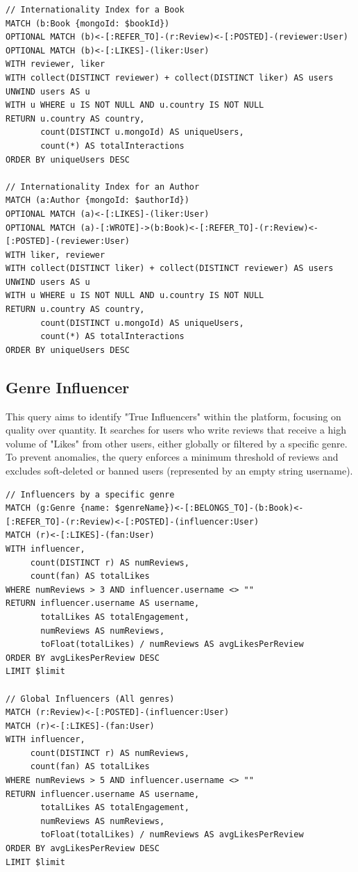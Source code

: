 \begin{lstlisting}[language=Cypher, caption={Cypher Query for Book and Author Internationality Index}]
// Internationality Index for a Book
MATCH (b:Book {mongoId: $bookId})
OPTIONAL MATCH (b)<-[:REFER_TO]-(r:Review)<-[:POSTED]-(reviewer:User)
OPTIONAL MATCH (b)<-[:LIKES]-(liker:User)
WITH reviewer, liker
WITH collect(DISTINCT reviewer) + collect(DISTINCT liker) AS users
UNWIND users AS u
WITH u WHERE u IS NOT NULL AND u.country IS NOT NULL
RETURN u.country AS country, 
       count(DISTINCT u.mongoId) AS uniqueUsers, 
       count(*) AS totalInteractions
ORDER BY uniqueUsers DESC

// Internationality Index for an Author
MATCH (a:Author {mongoId: $authorId})
OPTIONAL MATCH (a)<-[:LIKES]-(liker:User)
OPTIONAL MATCH (a)-[:WROTE]->(b:Book)<-[:REFER_TO]-(r:Review)<-[:POSTED]-(reviewer:User)
WITH liker, reviewer
WITH collect(DISTINCT liker) + collect(DISTINCT reviewer) AS users
UNWIND users AS u
WITH u WHERE u IS NOT NULL AND u.country IS NOT NULL
RETURN u.country AS country, 
       count(DISTINCT u.mongoId) AS uniqueUsers, 
       count(*) AS totalInteractions
ORDER BY uniqueUsers DESC
\end{lstlisting}

\subsection{Genre Influencer}
This query aims to identify "True Influencers" within the platform, focusing on quality over quantity. It searches for users who write reviews that receive a high volume of "Likes" from other users, either globally or filtered by a specific genre. To prevent anomalies, the query enforces a minimum threshold of reviews and excludes soft-deleted or banned users (represented by an empty string username).

\begin{lstlisting}[language=Cypher, caption={Cypher Query for Genre Influencers}]
// Influencers by a specific genre
MATCH (g:Genre {name: $genreName})<-[:BELONGS_TO]-(b:Book)<-[:REFER_TO]-(r:Review)<-[:POSTED]-(influencer:User)
MATCH (r)<-[:LIKES]-(fan:User)
WITH influencer,
     count(DISTINCT r) AS numReviews,
     count(fan) AS totalLikes
WHERE numReviews > 3 AND influencer.username <> ""
RETURN influencer.username AS username,
       totalLikes AS totalEngagement,
       numReviews AS numReviews,
       toFloat(totalLikes) / numReviews AS avgLikesPerReview
ORDER BY avgLikesPerReview DESC
LIMIT $limit

// Global Influencers (All genres)
MATCH (r:Review)<-[:POSTED]-(influencer:User)
MATCH (r)<-[:LIKES]-(fan:User)
WITH influencer,
     count(DISTINCT r) AS numReviews,
     count(fan) AS totalLikes
WHERE numReviews > 5 AND influencer.username <> ""
RETURN influencer.username AS username,
       totalLikes AS totalEngagement,
       numReviews AS numReviews,
       toFloat(totalLikes) / numReviews AS avgLikesPerReview
ORDER BY avgLikesPerReview DESC
LIMIT $limit
\end{lstlisting}



